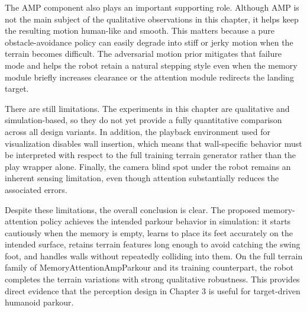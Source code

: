The AMP component also plays an important supporting role. Although AMP is not the main subject of the qualitative observations in this chapter, it helps keep the resulting motion human-like and smooth. This matters because a pure obstacle-avoidance policy can easily degrade into stiff or jerky motion when the terrain becomes difficult. The adversarial motion prior mitigates that failure mode and helps the robot retain a natural stepping style even when the memory module briefly increases clearance or the attention module redirects the landing target.

There are still limitations. The experiments in this chapter are qualitative and simulation-based, so they do not yet provide a fully quantitative comparison across all design variants. In addition, the playback environment used for visualization disables wall insertion, which means that wall-specific behavior must be interpreted with respect to the full training terrain generator rather than the play wrapper alone. Finally, the camera blind spot under the robot remains an inherent sensing limitation, even though attention substantially reduces the associated errors.

Despite these limitations, the overall conclusion is clear. The proposed memory-attention policy achieves the intended parkour behavior in simulation: it starts cautiously when the memory is empty, learns to place its feet accurately on the intended surface, retains terrain features long enough to avoid catching the swing foot, and handles walls without repeatedly colliding into them. On the full terrain family of MemoryAttentionAmpParkour and its training counterpart, the robot completes the terrain variations with strong qualitative robustness. This provides direct evidence that the perception design in Chapter 3 is useful for target-driven humanoid parkour.